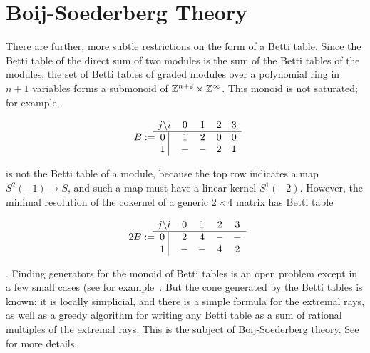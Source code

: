 \section{Boij-Soederberg Theory}
There are further, more subtle restrictions on the form of a Betti table. Since the Betti table of the direct sum of two modules is the sum of the Betti tables of the modules, 
the set of Betti tables of graded modules over a polynomial ring in $n+1$ variables forms a submonoid of 
${\mathbb Z}^{n+2} \times {\mathbb Z}^{\infty}$. This monoid is not saturated; for example, 
\begin{small}
$$
B := \begin{matrix}
j \backslash i &0&1&2&3\\ \hline
\text{0 }\vline &1&2&0&0\\
\text{1 }\vline &-&-&2&1\\
\end{matrix}
$$
\end{small}
is not the Betti table of a module, because the top row indicates a map $S^{2}(-1) \to S$, and such
a map must have a linear kernel $S^{1}(-2)$. However, the minimal resolution of the cokernel
of a generic $2\times 4$ matrix has Betti table
\begin{small}
$$
2B := \begin{matrix}
j \backslash i &0&1&2&3\\ \hline
\text{0 }\vline &2&4&-&-\\
\text{1 }\vline &-&-&4&2\\
\end{matrix}
$$
\end{small}.
Finding generators for the monoid of Betti tables is an open problem except in a few small cases (see for example~\cite{Erman-semigroup}. But the cone generated by the Betti tables is known: it is locally simplicial, and there is a simple formula for the extremal rays, as well as a greedy algorithm for writing any Betti table as a sum of rational multiples of the extremal rays. This is the subject of Boij-Soederberg theory. See~\cite{Eisenbud-Schreyer Betti numbers of graded modules and cohomology of vector bundles} for more details.


